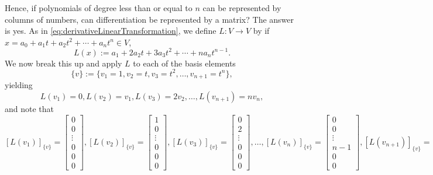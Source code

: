  Hence, if polynomials of degree less than or equal to $n$ can be represented by columns of numbers, can differentiation be represented by a matrix? The answer is yes. As in \eqref{eq:derivativeLinearTransformation}, we define $L:V \to V$ by if $x=a_0 + a_1 t + a_2 t^2 + \cdots + a_n t^n\in V$, 
\begin{equation}
    \label{eq:derivativeLinearTransformationRepeat}
    L( x):=   a_1  + 2 a_2 t + 3 a_3 t^2 + \cdots + n a_n t^{n-1}.
\end{equation}
We now break this up and apply $L$ to each of the basis elements  
$$\{v\}:=\{v_1=1, v_2=t, v_3=t^2, \ldots, v_{n+1}=t^n \},$$ 
yielding
 \begin{equation}
     \label{eq:representationdifferentiation}
     L(v_1)=0, L(v_2) = v_1, L(v_3) = 2 v_2, \ldots, L(v_{n+1})=n v_n, 
 \end{equation}
 and note that
 \begin{equation}
     \label{eq:representationdifferentiation02}
     [L(v_1)]_{\{v\}}= \left[ \begin{array}{c}0 \\ 0\\ \vdots\\ 0 \\ 0 \\ 0 \end{array}\right], 
     [L(v_2)]_{\{v\}}= \left[ \begin{array}{c}1 \\ 0\\ \vdots\\ 0 \\0  \\ 0 \end{array}\right],
     [L(v_3)]_{\{v\}}= \left[ \begin{array}{c}0 \\ 2\\ \vdots\\0 \\ 0 \\ 0 \end{array}\right],
     \ldots, 
      [L(v_{n})]_{\{v\}}= \left[ \begin{array}{c}0 \\ 0\\ \vdots\\n-1 \\ 0 \\ 0 \end{array}\right],
   [L(v_{n+1})]_{\{v\}}= \left[ \begin{array}{c}0 \\ 0\\ \vdots\\ 0 \\n \\ 0 \end{array}\right].
 \end{equation}
